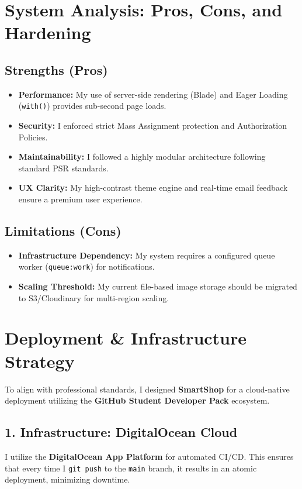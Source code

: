 \documentclass[12pt,a4paper]{article}
\begin{document}
\section{System Analysis: Pros, Cons, and Hardening}

\subsection{Strengths (Pros)}
\begin{itemize}
    \item \textbf{Performance:} My use of server-side rendering (Blade) and Eager Loading (\texttt{with()}) provides sub-second page loads.
    \item \textbf{Security:} I enforced strict Mass Assignment protection and Authorization Policies.
    \item \textbf{Maintainability:} I followed a highly modular architecture following standard PSR standards.
    \item \textbf{UX Clarity:} My high-contrast theme engine and real-time email feedback ensure a premium user experience.
\end{itemize}

\subsection{Limitations (Cons)}
\begin{itemize}
    \item \textbf{Infrastructure Dependency:} My system requires a configured queue worker (\texttt{queue:work}) for notifications.
    \item \textbf{Scaling Threshold:} My current file-based image storage should be migrated to S3/Cloudinary for multi-region scaling.
\end{itemize}

\section{Deployment \& Infrastructure Strategy}

To align with professional standards, I designed \textbf{SmartShop} for a cloud-native deployment utilizing the \textbf{GitHub Student Developer Pack} ecosystem.

\subsection{1. Infrastructure: DigitalOcean Cloud}
I utilize the \textbf{DigitalOcean App Platform} for automated CI/CD. This ensures that every time I \texttt{git push} to the \texttt{main} branch, it results in an atomic deployment, minimizing downtime.
\end{document}
